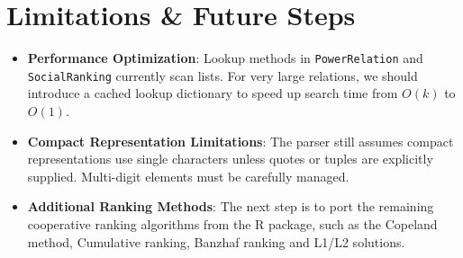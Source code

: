 \documentclass[11pt]{article}
\newcommand{\pathitem}[1]{\texttt{#1}}
\begin{document}
\section{Limitations \& Future Steps}

\begin{itemize}
  \item \textbf{Performance Optimization}: Lookup methods in \pathitem{PowerRelation} and \pathitem{SocialRanking} currently scan lists. For very large relations, we should introduce a cached lookup dictionary to speed up search time from $O(k)$ to $O(1)$.
  \item \textbf{Compact Representation Limitations}: The parser still assumes compact representations use single characters unless quotes or tuples are explicitly supplied. Multi-digit elements must be carefully managed.
  \item \textbf{Additional Ranking Methods}: The next step is to port the remaining cooperative ranking algorithms from the R package, such as the Copeland method, Cumulative ranking, Banzhaf ranking and L1/L2 solutions.
\end{itemize}
\end{document}
